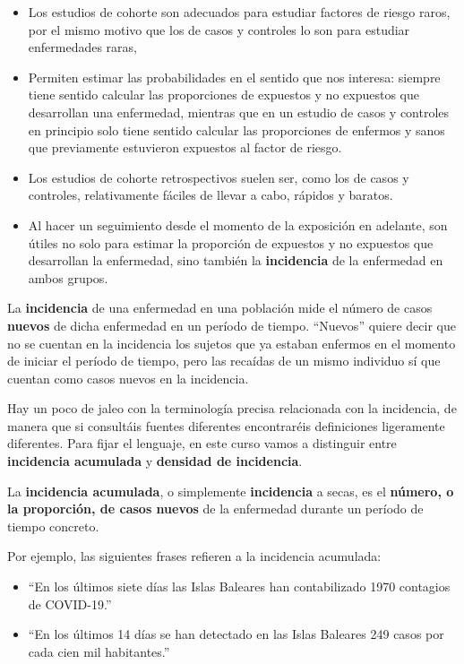 \documentclass[
]{book}
\theoremstyle{definition}
\theoremstyle{definition}
\theoremstyle{definition}
\theoremstyle{definition}
\theoremstyle{remark}
\begin{document}
\begin{itemize}
\item
  Los estudios de cohorte son adecuados para estudiar factores de riesgo raros, por el mismo motivo que los de casos y controles lo son para estudiar enfermedades raras,
\item
  Permiten estimar las probabilidades en el sentido que nos interesa: siempre tiene sentido calcular las proporciones de expuestos y no expuestos que desarrollan una enfermedad, mientras que en un estudio de casos y controles en principio solo tiene sentido calcular las proporciones de enfermos y sanos que previamente estuvieron expuestos al factor de riesgo.
\item
  Los estudios de cohorte retrospectivos suelen ser, como los de casos y controles, relativamente fáciles de llevar a cabo, rápidos y baratos.
\item
  Al hacer un seguimiento desde el momento de la exposición en adelante, son útiles no solo para estimar la proporción de expuestos y no expuestos que desarrollan la enfermedad, sino también la \textbf{incidencia} de la enfermedad en ambos grupos.
\end{itemize}

La \textbf{incidencia} de una enfermedad en una población mide el número de casos \textbf{nuevos} de dicha enfermedad en un período de tiempo. ``Nuevos'' quiere decir que no se cuentan en la incidencia los sujetos que ya estaban enfermos en el momento de iniciar el período de tiempo, pero las recaídas de un mismo individuo sí que cuentan como casos nuevos en la incidencia.

Hay un poco de jaleo con la terminología precisa relacionada con la incidencia, de manera que si consultáis fuentes diferentes encontraréis definiciones ligeramente diferentes. Para fijar el lenguaje, en este curso vamos a distinguir entre \textbf{incidencia acumulada} y \textbf{densidad de incidencia}.

La \textbf{incidencia acumulada}, o simplemente \textbf{incidencia} a secas, es el \textbf{número, o la proporción, de casos nuevos} de la enfermedad durante un período de tiempo concreto.

Por ejemplo, las siguientes frases refieren a la incidencia acumulada:

\begin{itemize}
\item
  ``En los últimos siete días las Islas Baleares han contabilizado 1970 contagios de COVID-19.''
\item
  ``En los últimos 14 días se han detectado en las Islas Baleares 249 casos por cada cien mil habitantes.''
\end{itemize}
\end{document}

